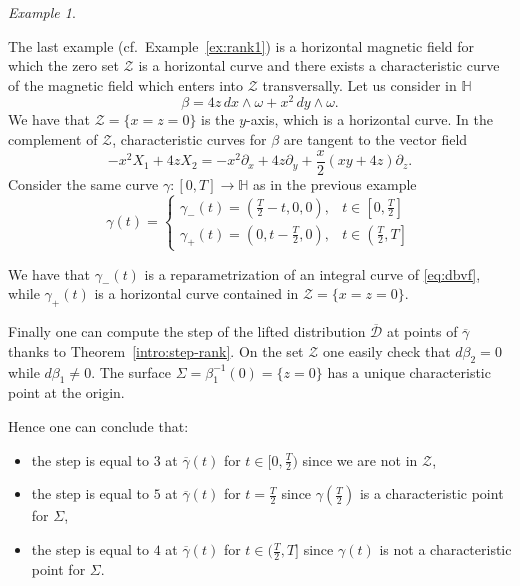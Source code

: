 \documentclass{amsart}
\theoremstyle{plain}
\theoremstyle{definition}
\theoremstyle{remark}
\newtheorem{example}[thm]{Example}
\newcommand{\p}{\partial}												%
\newcommand{\distr}{\mathcal{D}}								%
\newcommand{\B}{\beta}
\newcommand{\lift}[1]{\overline{#1}} 							%
\begin{document}
\begin{example}
\label{ex:crossing1}

The last example (cf.\ Example~\ref{ex:rank1}) is a horizontal magnetic field for which the zero set $\mathcal{Z}$ is a horizontal curve and there exists a characteristic curve of the magnetic field which enters into $\mathcal{Z}$ transversally.
Let us consider in $\mathbb{H}$ 
\begin{equation}
\B= 4z\,dx\wedge\omega+x^2\,dy\wedge\omega.
\end{equation}
We have that $\mathcal{Z}=\{x=z=0\}$ is  the $y$-axis, which is a horizontal curve. 
In the complement of $\mathcal{Z}$, characteristic curves for $\beta$ are tangent to the vector field
\begin{equation} \label{eq:dbvf}
-x^{2}X_1+4zX_2=-x^{2}\p_x+4z\p_y+\frac{x}{2}(xy+4z)\partial_{z}.
\end{equation}
Consider the same curve $\gamma:[0,T]\to \mathbb{H}$ as in the previous example
\begin{equation}
\gamma (t) = \begin{cases}
\gamma_{-}(t)=(\frac T 2 - t, 0,0), & t\in\left[0,\frac{T}{2}\right]\\
\gamma_{+}(t)=(0,t- \frac T 2,0),  & t\in\left(\frac{T}{2}, T\right]
\end{cases}
\end{equation}

We have that $\gamma_{-}(t)$ is a reparametrization of an integral curve of \eqref{eq:dbvf}, while $\gamma_{+}(t)$ is a horizontal curve contained in $\mathcal{Z}=\{x=z=0\}$.

Finally one can compute the step of the lifted distribution $\lift\distr$ at points of $\lift \gamma$ thanks to Theorem~\ref{intro:step-rank}. On the set $\mathcal{Z}$ one easily check that $d\beta_{2}=0$ while $d\beta_{1}\neq0$. The surface $\Sigma=\beta_{1}^{-1}(0)=\{z=0\}$ has a unique characteristic point at the origin.  

Hence one can conclude that:
\begin{itemize}
\item[(i)]  the step is equal to $3$ at $\lift\gamma(t)$ for $t\in [0,\frac{T}{2})$ since we are not in $\mathcal{Z}$, 
\item[(ii)] the step is equal to $5$ at $\lift\gamma(t)$ for $t=\frac{T}{2}$ since $\gamma(\frac{T}{2})$ is a characteristic point for $\Sigma$, 
\item[(iii)] the step is equal to $4$ at $\lift\gamma(t)$ for $t\in (\frac{T}{2},T]$ since $\gamma(t)$ is not a characteristic point for $\Sigma$.
\end{itemize}

\end{example}






\end{document}
